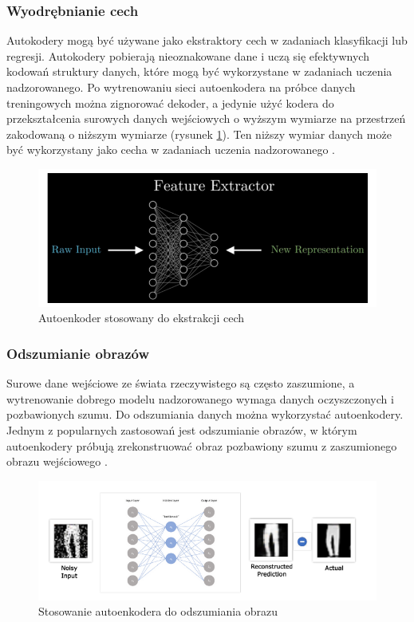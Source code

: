 \documentclass[12pt]{mwbk}
\theoremstyle{plain}
\theoremstyle{definition}
\theoremstyle{remark}
\newcommand\zrodlo[1]{\par\vspace{-3mm}{\small\textit{Źródło: }#1 }}
\begin{document}
\subsubsection{Wyodrębnianie cech}

Autokodery mogą być używane jako ekstraktory cech w zadaniach klasyfikacji lub regresji. Autokodery pobierają nieoznakowane dane i uczą się efektywnych kodowań struktury danych, które mogą być wykorzystane w zadaniach uczenia nadzorowanego. Po wytrenowaniu sieci autoenkodera na próbce danych treningowych można zignorować dekoder, a jedynie użyć kodera do przekształcenia surowych danych wejściowych o wyższym wymiarze na przestrzeń zakodowaną o niższym wymiarze (rysunek \ref{fig:feature-extractor}). Ten niższy wymiar danych może być wykorzystany jako cecha w zadaniach uczenia nadzorowanego \cite{kumar}.

\begin{figure}[!h]
	\centering
	\includegraphics[width=0.8\linewidth]{rys/feature_extractor.png}
	\caption{Autoenkoder stosowany do ekstrakcji cech}
	\zrodlo{\cite{kumar}}
	\label{fig:feature-extractor}
\end{figure}

\subsubsection{Odszumianie obrazów}

Surowe dane wejściowe ze świata rzeczywistego są często zaszumione, a wytrenowanie dobrego modelu nadzorowanego wymaga danych oczyszczonych i pozbawionych szumu. Do odszumiania danych można wykorzystać autoenkodery. Jednym z popularnych zastosowań jest odszumianie obrazów, w którym autoenkodery próbują zrekonstruować obraz pozbawiony szumu z zaszumionego obrazu wejściowego \cite{kumar}.

\newpage

\begin{figure}[!h]
	\centering
	\includegraphics[width=\linewidth]{rys/image_denoising.png}
	\caption{Stosowanie autoenkodera do odszumiania obrazu}
	\zrodlo{\cite{kumar}}
	\label{fig:image-denoising}
\end{figure}
\end{document}
